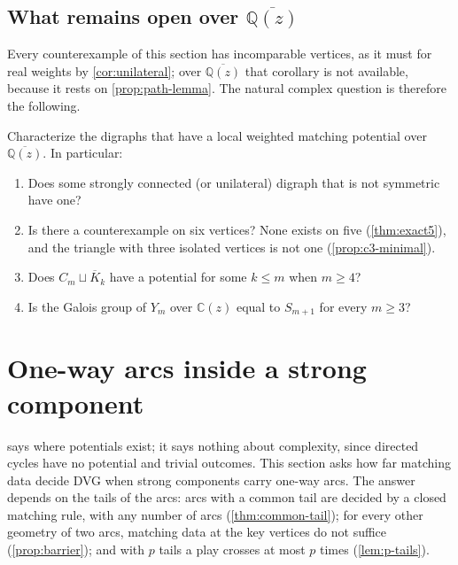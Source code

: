 \documentclass[final]{siamart0516}
\numberwithin{theorem}{section}
\numberwithin{equation}{section}
\theoremstyle{siamnonum}
\theoremstyle{plain}
\newcommand{\QQ}{\mathbb{Q}}
\newcommand{\CC}{\mathbb{C}}
\newcommand{\Qzbar}{\overline{\QQ(z)}}
\begin{document}
\subsection{What remains open over \texorpdfstring{$\Qzbar$}{the algebraic closure}}
Every counterexample of this section has incomparable vertices, as it must for real weights by \cref{cor:unilateral}; over $\Qzbar$ that corollary is not available, because it rests on \cref{prop:path-lemma}. The natural complex question is therefore the following.

\begin{problem}\label{prob:complex}
Characterize the digraphs that have a local weighted matching potential over $\Qzbar$. In particular:
\begin{enumerate}[label=\textup{(\alph*)}]
\item Does some strongly connected \textup{(}or unilateral\textup{)} digraph that is not symmetric have one?
\item Is there a counterexample on six vertices? None exists on five (\cref{thm:exact5}), and the triangle with three isolated vertices is not one (\cref{prop:c3-minimal}).
\item Does $C_m\sqcup\overline{K}_k$ have a potential for some $k\le m$ when $m\ge4$?
\item Is the Galois group of $Y_m$ over $\CC(z)$ equal to $S_{m+1}$ for every $m\ge3$?
\end{enumerate}
\end{problem}

\section{One-way arcs inside a strong component}\label{sec:oneway}

 says where potentials exist; it says nothing about complexity, since directed cycles have no potential and trivial outcomes. This section asks how far matching data decide DVG when strong components carry one-way arcs. The answer depends on the tails of the arcs: arcs with a common tail are decided by a closed matching rule, with any number of arcs (\cref{thm:common-tail}); for every other geometry of two arcs, matching data at the key vertices do not suffice (\cref{prop:barrier}); and with $p$ tails a play crosses at most $p$ times (\cref{lem:p-tails}).
\end{document}
